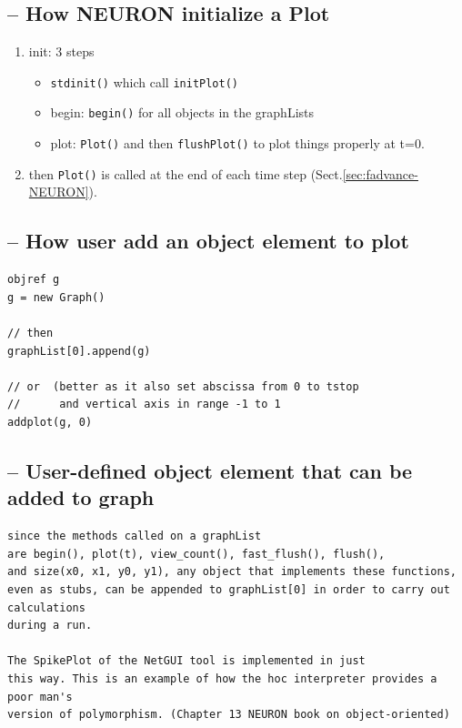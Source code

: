 \subsection{-- How NEURON initialize a Plot}

\begin{enumerate}
  \item init: 3 steps
  \begin{itemize}
    \item   \verb!stdinit()! which call \verb!initPlot()!
  
    \item begin: \verb!begin()! for all objects in the graphLists
  
    \item plot: \verb!Plot()! and then \verb!flushPlot()!
  to plot things properly at t=0.
  
  \end{itemize} 
  
  \item then \verb!Plot()! is called at the end of each time step
  (Sect.\ref{sec:fadvance-NEURON}).
\end{enumerate}

\subsection{-- How user add an object element to plot}

\begin{verbatim}
objref g
g = new Graph()

// then
graphList[0].append(g)

// or  (better as it also set abscissa from 0 to tstop
//      and vertical axis in range -1 to 1
addplot(g, 0)
\end{verbatim}

\subsection{-- User-defined object element that can be added to graph}

\begin{verbatim}
since the methods called on a graphList
are begin(), plot(t), view_count(), fast_flush(), flush(),
and size(x0, x1, y0, y1), any object that implements these functions,
even as stubs, can be appended to graphList[0] in order to carry out calculations
during a run.

The SpikePlot of the NetGUI tool is implemented in just
this way. This is an example of how the hoc interpreter provides a poor man's
version of polymorphism. (Chapter 13 NEURON book on object-oriented)
\end{verbatim}

